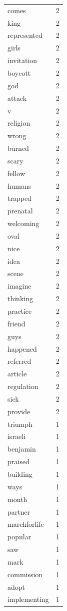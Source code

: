 \begin{tabular}{lr}
comes & 2 \\
king & 2 \\
represented & 2 \\
girls & 2 \\
invitation & 2 \\
boycott & 2 \\
god & 2 \\
attack & 2 \\
v & 2 \\
religion & 2 \\
wrong & 2 \\
burned & 2 \\
scary & 2 \\
fellow & 2 \\
humans & 2 \\
trapped & 2 \\
prenatal & 2 \\
welcoming & 2 \\
oval & 2 \\
nice & 2 \\
idea & 2 \\
scene & 2 \\
imagine & 2 \\
thinking & 2 \\
practice & 2 \\
friend & 2 \\
guys & 2 \\
happened & 2 \\
referred & 2 \\
article & 2 \\
regulation & 2 \\
sick & 2 \\
provide & 2 \\
triumph & 1 \\
israeli & 1 \\
benjamin & 1 \\
praised & 1 \\
building & 1 \\
ways & 1 \\
month & 1 \\
partner & 1 \\
marchforlife & 1 \\
popular & 1 \\
saw & 1 \\
mark & 1 \\
commission & 1 \\
adopt & 1 \\
implementing & 1 \\

\end{tabular}

